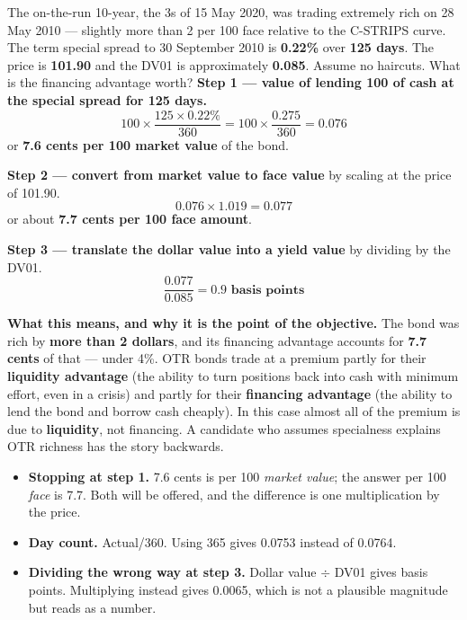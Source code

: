 \begin{lrexbox}
The on-the-run 10-year, the 3\textonehalf s of 15 May 2020, was trading extremely rich on 28 May 2010 --- slightly more than 2 per 100 face relative to the C-STRIPS curve. The term special spread to 30 September 2010 is \textbf{0.22\%} over \textbf{125 days}. The price is \textbf{101.90} and the DV01 is approximately \textbf{0.085}. Assume no haircuts. What is the financing advantage worth?
\tcblower
\textbf{Step 1 --- value of lending 100 of cash at the special spread for 125 days.}
\[ 100 \times \frac{125 \times 0.22\%}{360} = 100 \times \frac{0.275}{360} = \mathbf{0.076} \]
or \textbf{7.6 cents per 100 market value} of the bond.

\textbf{Step 2 --- convert from market value to face value} by scaling at the price of 101.90.
\[ 0.076 \times 1.019 = \mathbf{0.077} \]
or about \textbf{7.7 cents per 100 face amount}.

\textbf{Step 3 --- translate the dollar value into a yield value} by dividing by the DV01.
\[ \frac{0.077}{0.085} = \mathbf{0.9 \text{ basis points}} \]

\textbf{What this means, and why it is the point of the objective.} The bond was rich by \textbf{more than 2 dollars}, and its financing advantage accounts for \textbf{7.7 cents} of that --- under 4\%. OTR bonds trade at a premium partly for their \textbf{liquidity advantage} (the ability to turn positions back into cash with minimum effort, even in a crisis) and partly for their \textbf{financing advantage} (the ability to lend the bond and borrow cash cheaply). In this case almost all of the premium is due to \textbf{liquidity}, not financing. A candidate who assumes specialness explains OTR richness has the story backwards.
\end{lrexbox}

\begin{lrtrapbox}
\begin{itemize}
\item \textbf{Stopping at step 1.} 7.6 cents is per 100 \emph{market value}; the answer per 100 \emph{face} is 7.7. Both will be offered, and the difference is one multiplication by the price.
\item \textbf{Day count.} Actual/360. Using 365 gives 0.0753 instead of 0.0764.
\item \textbf{Dividing the wrong way at step 3.} Dollar value $\div$ DV01 gives basis points. Multiplying instead gives 0.0065, which is not a plausible magnitude but reads as a number.
\end{itemize}
\end{lrtrapbox}

